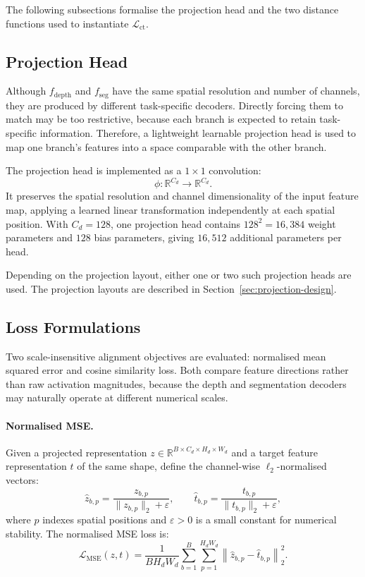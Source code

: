 The following subsections formalise the projection head and the two
distance functions used to instantiate $\mathcal{L}_\text{ct}$.

\subsection{Projection Head}
\label{sec:proj-head}

Although $f_\text{depth}$ and $f_\text{seg}$ have the same spatial
resolution and number of channels, they are produced by different
task-specific decoders. Directly forcing them to match may be too
restrictive, because each branch is expected to retain task-specific
information. Therefore, a lightweight learnable projection head is used to
map one branch's features into a space comparable with the other branch.

The projection head is implemented as a $1 \times 1$ convolution:
\[
    \phi \colon \mathbb{R}^{C_d} \to \mathbb{R}^{C_d}.
\]
It preserves the spatial resolution and channel dimensionality of the
input feature map, applying a learned linear transformation independently
at each spatial position. With $C_d=128$, one projection head contains
$128^2 = 16{,}384$ weight parameters and $128$ bias parameters, giving
$16{,}512$ additional parameters per head.

Depending on the projection layout, either one or two such projection
heads are used. The projection layouts are described in
Section~\ref{sec:projection-design}.

\subsection{Loss Formulations}
\label{sec:loss-forms}

Two scale-insensitive alignment objectives are evaluated: normalised mean
squared error and cosine similarity loss. Both compare feature directions
rather than raw activation magnitudes, because the depth and segmentation
decoders may naturally operate at different numerical scales.

\paragraph{Normalised MSE.}
Given a projected representation
$z \in \mathbb{R}^{B \times C_d \times H_d \times W_d}$ and a target
feature representation $t$ of the same shape, define the channel-wise
$\ell_2$-normalised vectors:
\[
    \hat{z}_{b,p}
    =
    \frac{z_{b,p}}{\|z_{b,p}\|_2 + \varepsilon},
    \qquad
    \hat{t}_{b,p}
    =
    \frac{t_{b,p}}{\|t_{b,p}\|_2 + \varepsilon},
\]
where $p$ indexes spatial positions and $\varepsilon > 0$ is a small
constant for numerical stability. The normalised MSE loss is:
\begin{equation}
    \mathcal{L}_\text{MSE}(z,t)
    =
    \frac{1}{B H_d W_d}
    \sum_{b=1}^{B}
    \sum_{p=1}^{H_d W_d}
    \left\|
    \hat{z}_{b,p}
    -
    \hat{t}_{b,p}
    \right\|_2^2.
    \label{eq:lct-mse}
\end{equation}


